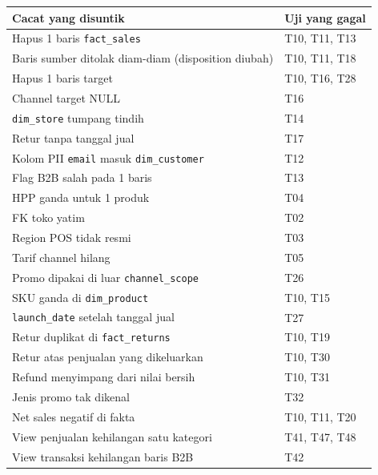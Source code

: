 \documentclass[10pt,a4paper]{article}
\begin{document}
{\def\LTcaptype{none} %
\begin{longtable}[]{@{}
  >{\raggedright\arraybackslash}p{}
  >{\raggedright\arraybackslash}p{}@{}}
\toprule\noalign{}
\begin{minipage}[b]{\linewidth}\raggedright
Cacat yang disuntik
\end{minipage} & \begin{minipage}[b]{\linewidth}\raggedright
Uji yang gagal
\end{minipage} \\
\midrule\noalign{}
\endhead
\bottomrule\noalign{}
\endlastfoot
Hapus 1 baris \texttt{fact\_\allowbreak{}sales} & T10, T11, T13 \\
Baris sumber ditolak diam-diam (disposition diubah) & T10, T11, T18 \\
Hapus 1 baris target & T10, T16, T28 \\
Channel target NULL & T16 \\
\texttt{dim\_\allowbreak{}store} tumpang tindih & T14 \\
Retur tanpa tanggal jual & T17 \\
Kolom PII \texttt{email} masuk \texttt{dim\_\allowbreak{}customer} & T12 \\
Flag B2B salah pada 1 baris & T13 \\
HPP ganda untuk 1 produk & T04 \\
FK toko yatim & T02 \\
Region POS tidak resmi & T03 \\
Tarif channel hilang & T05 \\
Promo dipakai di luar \texttt{channel\_\allowbreak{}scope} & T26 \\
SKU ganda di \texttt{dim\_\allowbreak{}product} & T10, T15 \\
\texttt{launch\_\allowbreak{}date} setelah tanggal jual & T27 \\
Retur duplikat di \texttt{fact\_\allowbreak{}returns} & T10, T19 \\
Retur atas penjualan yang dikeluarkan & T10, T30 \\
Refund menyimpang dari nilai bersih & T10, T31 \\
Jenis promo tak dikenal & T32 \\
Net sales negatif di fakta & T10, T11, T20 \\
View penjualan kehilangan satu kategori & T41, T47, T48 \\
View transaksi kehilangan baris B2B & T42 \\

\end{longtable}}
\end{document}

